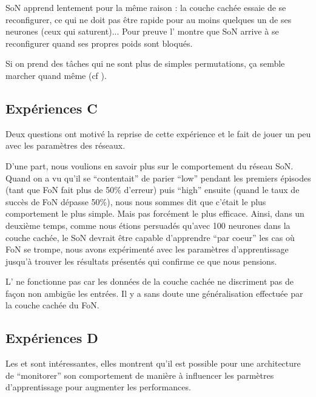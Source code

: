 SoN apprend lentement pour la même raison : 
la couche cachée essaie de se reconfigurer, ce qui ne doit pas être rapide pour au moins quelques un de ses neurones (ceux qui saturent)... Pour preuve l' montre que SoN arrive à se reconfigurer
quand ses propres poids sont bloqués.

Si on prend des tâches qui ne sont plus de simples permutations, ça semble marcher quand même (cf  ).

\subsection{Expériences C
\label{sec:expC}}

Deux questions ont motivé la reprise de cette expérience et le fait de jouer un peu avec les paramètres des réseaux. 

D'une part, nous voulions en savoir plus sur le comportement du réseau SoN. Quand on a vu qu'il se ``contentait'' de parier ``low'' pendant les premiers épisodes (tant que FoN fait plus de 50\% d'erreur) 
puis ``high'' ensuite (quand le taux de succès de FoN dépasse 50\%), nous nous sommes dit que c'était le plus comportement le plus simple. Mais pas forcément le plus efficace.
Ainsi, dans un deuxième temps, comme nous étions persuadés qu'avec 100 neurones dans la couche cachée, le SoN devrait être capable d'apprendre ``par coeur'' les cas où FoN se trompe, nous avons
expérimenté avec les paramètres d'apprentissage jusqu'à trouver les résultats présentés qui confirme ce que nous pensions.

L' ne fonctionne pas car les données de la couche cachée ne discriment pas de façon non ambigüe les entrées. Il y a sans doute une généralisation effectuée par la couche cachée du FoN.

\subsection{Expériences D
\label{sec:expD}}

Les  et  sont intéressantes, elles montrent qu'il est possible pour une architecture de ``monitorer'' son comportement de manière à influencer les parmètres d'apprentissage 
pour augmenter les performances.
